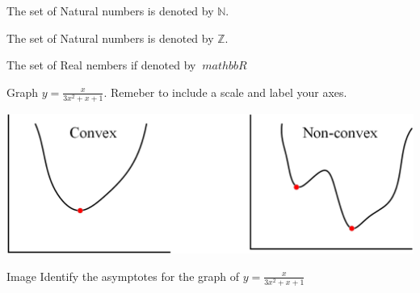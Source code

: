 \documentclass[11pt]{article}
\def\eq1{y=\frac{x}{3x^2+x+1}}
\def\labelaxes{Remeber to include a scale and label your axes.}
\begin{document}
The set of Natural numbers is denoted by $\mathbb{N}$.

The set of Natural numbers is denoted by $\mathbb{Z}$.

The set of Real nembers if denoted by $\ mathbb{R}$

Graph $\eq1$. \labelaxes

\begin{center}
\includegraphics[scale=0.5]{Nonconvex1.png}
\end{center}



Image 
Identify the asymptotes for the graph of $\eq1$
\end{document}
